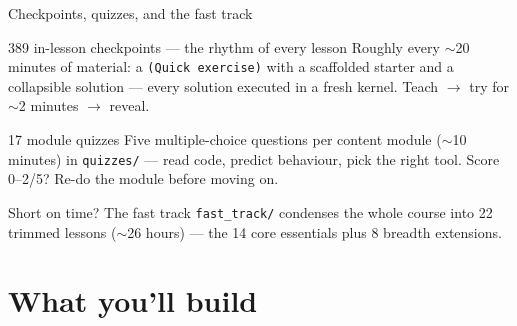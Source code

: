 \documentclass[aspectratio=169,11pt]{beamer}
\begin{document}
\begin{frame}{Checkpoints, quizzes, and the fast track}
  \begin{block}{389 in-lesson checkpoints --- the rhythm of every lesson}
    Roughly every $\sim$20 minutes of material: a \texttt{(Quick exercise)} with a scaffolded starter and a collapsible solution --- every solution executed in a fresh kernel. Teach $\to$ try for $\sim$2 minutes $\to$ reveal.
  \end{block}
  \begin{exampleblock}{17 module quizzes}
    Five multiple-choice questions per content module ($\sim$10 minutes) in \texttt{quizzes/} --- read code, predict behaviour, pick the right tool. Score 0--2/5? Re-do the module before moving on.
  \end{exampleblock}
  \begin{block}{Short on time? The fast track}
    \texttt{fast\_track/} condenses the whole course into 22 trimmed lessons ($\sim$26 hours) --- the 14 core essentials plus 8 breadth extensions.
  \end{block}
\end{frame}

\section{What you'll build}
\end{document}
